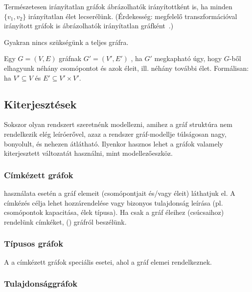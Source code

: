Természetesen irányítatlan gráfok ábrázolhatók irányítottként is, ha minden $\{v_1, v_2\}$ irányítatlan élet lecserélünk. (Érdekesség: megfelelő transzformációval irányított gráfok is ábrázolhatók irányítatlan gráfként~\cite{rodriguez2008mapping}.)

Gyakran nincs szükségünk a teljes gráfra.

\begin{definicio}
Egy $G = (V, E)$ gráfnak $G' = (V', E')$ , ha $G'$ megkapható úgy, hogy $G$-ből elhagyunk néhány csomópontot és azok éleit, ill. néhány további élet. Formálisan: ha $V' \subseteq V$ és $E' \subseteq V' \times V'$.
\end{definicio}	

\subsection{Kiterjesztések}

Sokszor olyan rendszert szeretnénk modellezni, amihez a gráf struktúra nem rendelkezik elég leíróerővel, azaz a rendszer gráf-modellje túlságosan nagy, bonyolult, és nehezen átlátható. Ilyenkor hasznos lehet a gráfok valamely kiterjesztett változatát használni, mint modellezőeszköz.

\subsubsection{Címkézett gráfok}

 használata esetén a gráf elemeit (csomópontjait és/vagy éleit)  láthatjuk el. A címkézés célja lehet  hozzárendelése vagy bizonyos tulajdonság leírása (pl. csomópontok kapacitása, élek típusa).
Ha csak a gráf éleihez (csúcsaihoz) rendelünk címkéket,  () gráfról beszélünk.

\subsubsection{Típusos gráfok}

A  a címkézett gráfok speciális esetei, ahol a gráf elemei 
  rendelkeznek.
 
\subsubsection{Tulajdonsággráfok}

